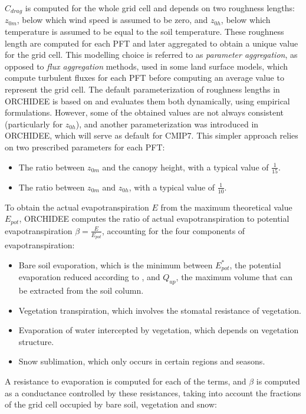 $C_{drag}$ is computed for the whole grid cell and depends on two roughness lengths: $z_{0m}$, below which wind speed is assumed to be zero, and $z_{0h}$, below which temperature is assumed to be equal to the soil temperature. These roughness length are computed for each PFT and later aggregated to obtain a unique value for the grid cell. This modelling choice is referred to as \textit{parameter aggregation}, as opposed to \textit{flux aggregation} methods, used in some land surface models, which compute turbulent fluxes for each PFT before computing an average value to represent the grid cell.
The default parameterization of roughness lengths in ORCHIDEE is based on \citet{su_evaluation_2001} and evaluates them both dynamically, using empirical formulations. However, some of the obtained values are not always consistent (particularly for $z_{0h}$), and another parameterization was introduced in ORCHIDEE, which will serve as default for CMIP7.
This simpler approach relies on two prescribed parameters for each PFT:  
\begin{itemize}
    \item The ratio between $z_{0m}$ and the canopy height, with a typical value of $\frac{1}{15}$.
    \item The ratio between $z_{0m}$ and $z_{0h}$, with a typical value of $\frac{1}{10}$.  
\end{itemize}

To obtain the actual evapotranspiration $E$ from the maximum theoretical value $E_{pot}$, ORCHIDEE computes the ratio of actual evapotranspiration to potential evapotranspiration $\beta = \frac{E}{E_{pot}}$, accounting for the four components of evapotranspiration:  

\begin{itemize}
    \item Bare soil evaporation, which is the minimum between $E_{pot}^*$, the potential evaporation reduced according to \citet{milly_potential_1992}, and $Q_{up}$, the maximum volume that can be extracted from the soil column.
    \item Vegetation transpiration, which involves the stomatal resistance of vegetation.
    \item Evaporation of water intercepted by vegetation, which depends on vegetation structure.
    \item Snow sublimation, which only occurs in certain regions and seasons.
\end{itemize}

A resistance to evaporation is computed for each of the terms, and $\beta$ is computed as a conductance controlled by these resistances, taking into account the fractions of the grid cell occupied by bare soil, vegetation and snow:

